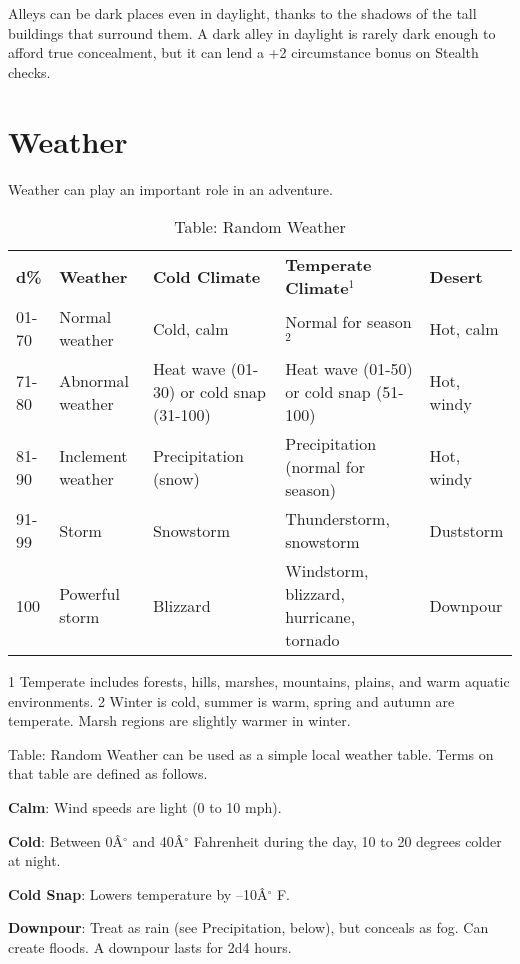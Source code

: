 Alleys can be dark places even in daylight, thanks to the shadows of the tall buildings that surround them. A dark alley in daylight is rarely dark enough to afford true concealment, but it can lend a +2 circumstance bonus on Stealth checks.
				
\section{Weather}

				
Weather can play an important role in an adventure.
				
\begin{table}[]
\sffamily
\caption{Table: Random Weather}
\begin{tabular}{lllll}
\textbf{d\%} & \textbf{Weather} & \textbf{Cold Climate} & \textbf{Temperate Climate\(^{1}\)} & \textbf{Desert}\\
01-70 & Normal weather & Cold, calm & Normal for season\(^{2}\) & Hot, calm\\
71-80 & Abnormal weather & Heat wave (01-30) or cold snap (31-100) & Heat wave (01-50) or cold snap (51-100) & Hot, windy\\
81-90 & Inclement weather & Precipitation (snow) & Precipitation (normal for season) & Hot, windy\\
91-99 & Storm & Snowstorm & Thunderstorm, snowstorm & Duststorm\\
100 & Powerful storm & Blizzard & Windstorm, blizzard, hurricane, tornado & Downpour\\
\end{tabular}
1 Temperate includes forests, hills, marshes, mountains, plains, and warm aquatic environments.
2 Winter is cold, summer is warm, spring and autumn are temperate. Marsh regions are slightly warmer in winter.
\end{table}
				
Table: Random Weather can be used as a simple local weather table. Terms on that table are defined as follows.
				
\textbf{Calm}: Wind speeds are light (0 to 10 mph).
				
\textbf{Cold}: Between 0\^A\mbox{${}^\circ$} and 40\^A\mbox{${}^\circ$} Fahrenheit during the day, 10 to 20 degrees colder at night.
				
\textbf{Cold Snap}: Lowers temperature by --10\^A\mbox{${}^\circ$} F.
				
\textbf{Downpour}: Treat as rain (see Precipitation, below), but conceals as fog. Can create floods. A downpour lasts for 2d4 hours.
				
